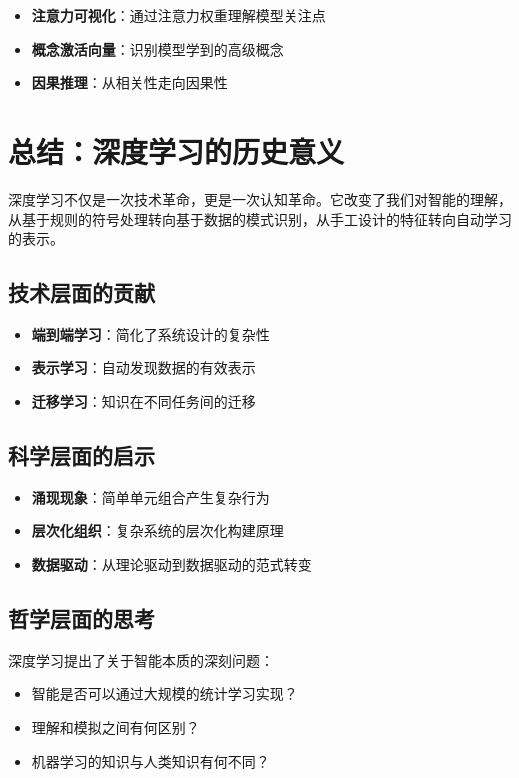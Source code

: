 \begin{itemize}
\item \textbf{注意力可视化}：通过注意力权重理解模型关注点
\item \textbf{概念激活向量}：识别模型学到的高级概念
\item \textbf{因果推理}：从相关性走向因果性
\end{itemize}

\section{总结：深度学习的历史意义}

深度学习不仅是一次技术革命，更是一次认知革命。它改变了我们对智能的理解，从基于规则的符号处理转向基于数据的模式识别，从手工设计的特征转向自动学习的表示。

\subsection{技术层面的贡献}

\begin{itemize}
\item \textbf{端到端学习}：简化了系统设计的复杂性
\item \textbf{表示学习}：自动发现数据的有效表示
\item \textbf{迁移学习}：知识在不同任务间的迁移
\end{itemize}

\subsection{科学层面的启示}

\begin{itemize}
\item \textbf{涌现现象}：简单单元组合产生复杂行为
\item \textbf{层次化组织}：复杂系统的层次化构建原理
\item \textbf{数据驱动}：从理论驱动到数据驱动的范式转变
\end{itemize}

\subsection{哲学层面的思考}

深度学习提出了关于智能本质的深刻问题：

\begin{itemize}
\item 智能是否可以通过大规模的统计学习实现？
\item 理解和模拟之间有何区别？
\item 机器学习的知识与人类知识有何不同？
\end{itemize}

